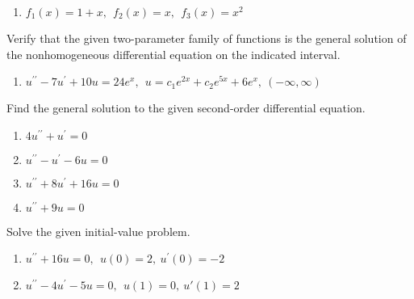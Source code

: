 \begin{fullwidth}
\begin{enumerate}[resume=outerlist]
\vspace{1.0cm}

\item $f_1(x)=1+x, \ \ f_2(x)=x, \ \ f_3(x)=x^2$
\vspace{1.0cm}
\end{enumerate}


Verify that the given two-parameter family of functions is the general solution of the nonhomogeneous differential equation on the indicated interval.

\begin{enumerate}[resume]
\item $u^{\prime \prime}-7u^{\prime}+10u=24e^{x}, \ \ u=c_1e^{2x}+c_2e^{5x}+6e^{x}, \ \left(-\infty,\infty\right)$

\vspace{1.0cm} 

\end{enumerate}

Find the general solution to the given second-order differential equation.

\begin{enumerate}[resume]
\item $4u^{\prime \prime}+u^{\prime} = 0$

\vspace{1.0cm}

\item $u^{\prime \prime}-u^{\prime}-6u=0$

\vspace{1.0cm}

\item $u^{\prime \prime}+8u^{\prime}+16u=0$

\vspace{1.0cm}

\item $u^{\prime \prime}+9u=0$

\vspace{1.0cm}
\end{enumerate}


Solve the given initial-value problem.

\begin{enumerate}[resume]
\item $u^{\prime \prime}+16u=0, \ \ u(0)=2, \ u^{\prime}(0)=-2$

\vspace{1.0cm}

\item $u^{\prime \prime}-4u^{\prime}-5u=0, \ \ u(1)=0, \ u{\prime}(1)=2$


\end{enumerate}
\end{fullwidth}
